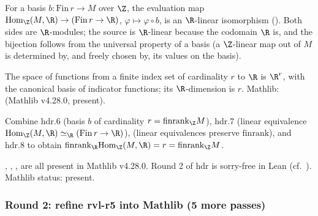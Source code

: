 \begin{lemma}
\label{lem:hdr-r7}
For a basis $b : \mathrm{Fin}\,r \to M$ over $\Z$, the evaluation map $\mathrm{Hom}_\Z(M,\R) \to (\mathrm{Fin}\,r \to \R)$, $\varphi \mapsto \varphi \circ b$, is an $\R$-linear isomorphism ().  Both sides are $\R$-modules; the source is $\R$-linear because the codomain $\R$ is, and the bijection follows from the universal property of a basis (a $\Z$-linear map out of $M$ is determined by, and freely chosen by, its values on the basis).
\leanok
\end{lemma}

\begin{lemma}[Pass hdr.8: $\dim_\R(\mathrm{Fin}\,r \to \R) = r$]
\label{lem:hdr-r8}
The space of functions from a finite index set of cardinality $r$ to $\R$ is $\R^r$, with the canonical basis of indicator functions; its $\R$-dimension is $r$.  Mathlib:  (Mathlib v4.28.0, present).
\leanok\mathlibok
\end{lemma}

\begin{lemma}
\label{lem:hdr-r9}
Combine hdr.6 (basis $b$ of cardinality $r = \mathrm{finrank}_\Z M$), hdr.7 (linear equivalence $\mathrm{Hom}_\Z(M,\R) \simeq_{\R} (\mathrm{Fin}\,r \to \R)$),  (linear equivalences preserve $\mathrm{finrank}$), and hdr.8 to obtain $\mathrm{finrank}_\R \mathrm{Hom}_\Z(M,\R) = r = \mathrm{finrank}_\Z M$.
\leanok
\end{lemma}

\begin{lemma}
\label{lem:hdr-r10}
, , ,  are all present in Mathlib v4.28.0.  Round 2 of hdr is sorry-free in Lean (cf.\ ).  Mathlib status: present.
\leanok\mathlibok
\end{lemma}

\subsubsection*{Round 2: refine rvl-r5 into Mathlib (5 more passes)}

